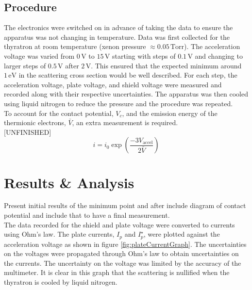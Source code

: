 \documentclass[%
reprint,
amsmath,amssymb,
aps,
floatfix
]{revtex4-2}
\begin{document}
	\subsection{Procedure}
	The electronics were switched on in advance of taking the data to ensure the apparatus was not changing in temperature. Data was first collected for the thyratron at room temperature (xenon pressure $\approx 0.05 \,\text{Torr}$). The acceleration voltage was varied from $0 \,\text{V}$ to $15 \,\text{V}$ starting with steps of $0.1 \,\text{V}$ and changing to larger steps of $0.5 \,\text{V}$ after $2 \,\text{V}$. This ensured that the expected minimum around $1 \,\text{eV}$ in the scattering cross section would be well described. For each step, the acceleration voltage, plate voltage, and shield voltage were measured and recorded along with their respective uncertainties. The apparatus was then cooled using liquid nitrogen to reduce the pressure and the procedure was repeated.\\
	
	To account for the contact potential, $V_c$, and the emission energy of the thermionic electrons, $\bar{V}$, an extra measurement is required.\\
	
	[UNFINISHED]
	\begin{equation}
		i = i_0 \exp{\left( \frac{-3 V_\text{accel}}{2 \bar{V}} \right)}
		\label{eq:slope}
	\end{equation}
	
	\section{Results \& Analysis}
	Present initial results of the minimum point and after include diagram of contact potential and include that to have a final measurement.\\
	
	The data recorded for the shield and plate voltage were converted to currents using Ohm's law. The plate currents, $I_p$ and $I_p^\star$, were plotted against the acceleration voltage as shown in figure \ref{fig:plateCurrentGraph}. The uncertainties on the voltages were propagated through Ohm's law to obtain uncertainties on the currents. The uncertainty on the voltage was limited by the accuracy of the multimeter. It is clear in this graph that the scattering is nullified when the thyratron is cooled by liquid nitrogen.\\
	
\end{document}
